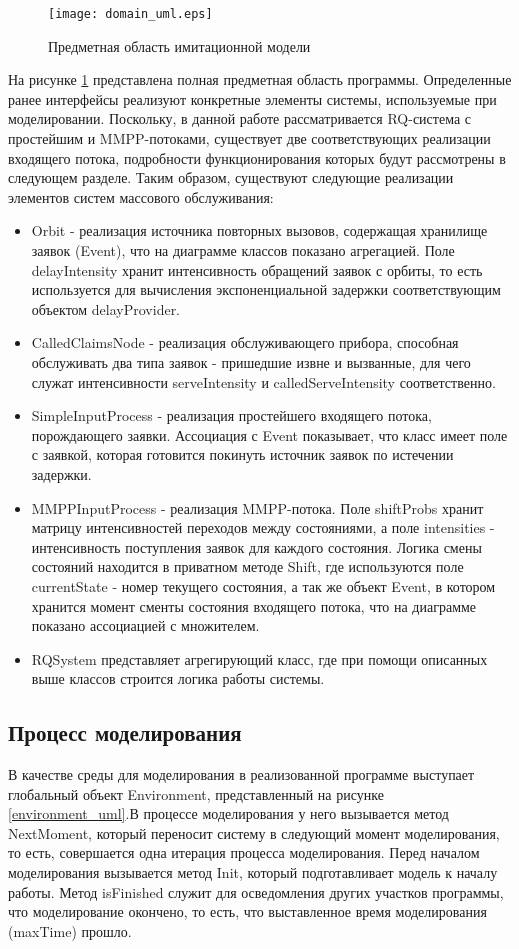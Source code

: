 \begin{figure}[H]
	\centering
	\texttt{[image: domain\_uml.eps]}
	\caption{Предметная область имитационной модели}
	\label{domain_uml}
\end{figure}
На рисунке \ref{domain_uml} представлена полная предметная область программы. Определенные ранее интерфейсы реализуют конкретные элементы системы, используемые при моделировании. Поскольку, в данной работе рассматривается RQ-система с простейшим и MMPP-потоками, существует две соответствующих реализации входящего потока, подробности функционирования которых будут рассмотрены в следующем разделе. Таким образом, существуют следующие реализации элементов систем массового обслуживания:
\begin{itemize}
	\item Orbit - реализация источника повторных вызовов, содержащая хранилище заявок (Event), что на диаграмме классов показано агрегацией. Поле delayIntensity хранит интенсивность обращений заявок с орбиты, то есть используется для вычисления экспоненциальной задержки соответствующим объектом delayProvider.
	\item CalledClaimsNode - реализация обслуживающего прибора, способная обслуживать два типа заявок - пришедшие извне и вызванные, для чего служат интенсивности serveIntensity и calledServeIntensity соответственно.
	\item SimpleInputProcess - реализация простейшего входящего потока, порождающего заявки. Ассоциация с Event показывает, что класс имеет поле с заявкой, которая готовится покинуть источник заявок по истечении задержки.
	\item MMPPInputProcess - реализация MMPP-потока. Поле shiftProbs хранит матрицу интенсивностей переходов между состояниями, а поле intensities - интенсивность поступления заявок для каждого состояния. Логика смены состояний находится в приватном методе Shift, где используются поле currentState - номер текущего состояния, а так же объект Event, в котором хранится момент сменты состояния входящего потока, что на диаграмме показано ассоциацией с множителем.
	\item RQSystem представляет агрегирующий класс, где при помощи описанных выше классов строится логика работы системы.
\end{itemize}
\clearpage
\subsection{Процесс моделирования}
В качестве среды для моделирования в реализованной программе выступает глобальный объект Environment, представленный на рисунке \ref{environment_uml}.В процессе моделирования у него вызывается метод NextMoment, который переносит систему в следующий момент моделирования, то есть, совершается одна итерация процесса моделирования. Перед началом моделирования вызывается метод Init, который подготавливает модель к началу работы. Метод isFinished служит для осведомления других участков программы, что моделирование окончено, то есть, что выставленное время моделирования (maxTime) прошло.

